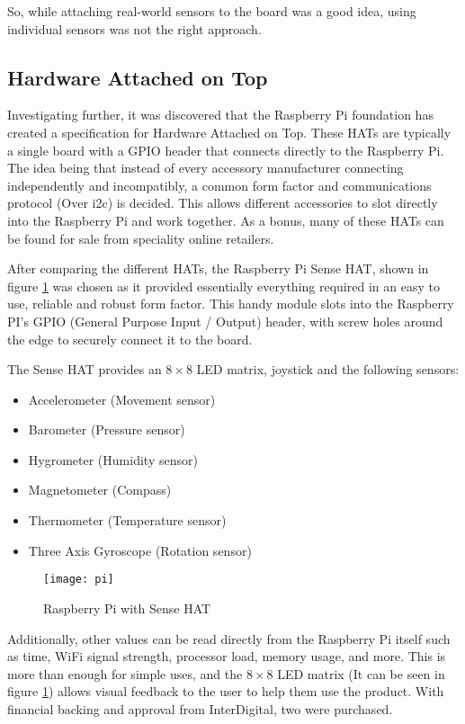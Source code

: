 So, while attaching real-world sensors to the board was a good idea, using individual sensors was not the right approach.

\subsection{Hardware Attached on Top}

Investigating further, it was discovered that the Raspberry Pi foundation has created a specification for Hardware Attached on Top. These HATs are typically a single board with a GPIO header that connects directly to the Raspberry Pi. The idea being that instead of every accessory manufacturer connecting independently and incompatibly, a common form factor and communications protocol (Over i2c) is decided. This allows different accessories to slot directly into the Raspberry Pi and work together. As a bonus, many of these HATs can be found for sale from speciality online retailers.

After comparing the different HATs, the Raspberry Pi Sense HAT, shown in figure \ref{fig:pi} was chosen as it provided essentially everything required in an easy to use, reliable and robust form factor. This handy module slots into the Raspberry PI's GPIO (General Purpose Input / Output) header, with screw holes around the edge to securely connect it to the board.

The Sense HAT provides an $8\times8$ LED matrix, joystick and the following sensors:

\begin{itemize}
  \item Accelerometer (Movement sensor)
  \item Barometer (Pressure sensor)
  \item Hygrometer (Humidity sensor)
  \item Magnetometer (Compass)
  \item Thermometer (Temperature sensor)
  \item Three Axis Gyroscope (Rotation sensor)
\end{itemize}

\begin{figure}[H]
  \centering
  \texttt{[image: pi]}
  \caption[Raspberry Pi with Sense HAT]{Raspberry Pi with Sense HAT}
  \label{fig:pi}
\end{figure}

Additionally, other values can be read directly from the Raspberry Pi itself such as time, WiFi signal strength, processor load, memory usage, and more. This is more than enough for simple uses, and the $8\times8$ LED matrix (It can be seen in figure \ref{fig:pi}) allows visual feedback to the user to help them use the product. With financial backing and approval from InterDigital, two were purchased.

